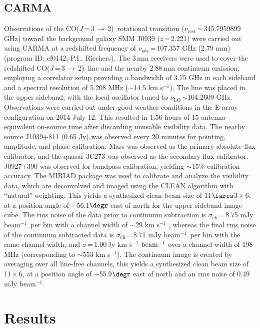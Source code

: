 \documentclass[twocolumn,apj,numberedappendix]{emulateapj}
\newcommand{\CO}{\mbox{CO($J$\,=\,3\,$\rightarrow$\,2) }}
\newcommand{\pmOne}{\mbox{$^{-1}$}}
\begin{document}
\subsection{CARMA} \label{sec:carmadata}
Observations of the \CO rotational transition ($\nu_\textrm{rest}$\,=\,345.7959899 GHz) toward the background galaxy SMM
J0939 ($z$\,=\,2.221) were carried out using CARMA at a redshifted frequency of $\nu_{obs}$\,=\,107.357\,\,GHz (2.79\,\,mm)  (program ID: cf0142; P.I.: Riechers). The 3\,mm receivers were used to cover the redshifted \CO line and the nearby 2.88\,mm continuum emission, employing a correlator setup providing a bandwidth of 3.75 GHz in each sideband and a spectral resolution of 5.208 MHz ($\sim$14.5 km\,\,s\pmOne). The line was placed in the
upper sideband, with the local oscillator tuned to $\nu_\textrm{LO}$\,$\sim$104.2609 GHz.
Observations were carried out under good
weather conditions in the E array configuration on 2014 July 12. This resulted in 1.56 hours of 15 antenna-equivalent on-source time after discarding unusable visibility data.
The nearby source J1039+811 (0.65\,\,Jy) was observed every 20 minutes for
pointing, amplitude, and phase calibration. Mars was observed as the primary
absolute flux calibrator, and the quasar 3C273 was observed as the secondary
flux calibrator. J0927+390 was observed for bandpass calibration, yielding $\sim
$15\% calibration accuracy.
The {\sc MIRIAD} package was used to calibrate and analyze the visibility data, which are deconvolved and imaged using
the CLEAN algorithm with ``natural" weighting. This yields a synthesized clean beam size of 11$\farcs$3\,$\times$\,6, at a position angle of $-$56.1$\degr$ east of north for the upper sideband image cube. 
The rms noise of the data prior to continuum subtraction is $\sigma_\textrm{ch}$\,=\,8.75\,\,mJy\,\,beam\pmOne\ per bin 
with a channel width of $\sim$29 km\,\,s\pmOne
, whereas the final rms noise of the continuum subtracted data is $\sigma_\textrm{ch}$\,=\,8.71\,\,mJy\,\,beam\pmOne\ per bin with 
the same channel width, and $\sigma$\,=\,1.00\,Jy\,\,km\,\,s\pmOne\,\,$\rm beam^{-1}$ over a channel 
width of 198 MHz (corresponding to $\sim$553\,\,km\,\,s\pmOne). 
The continuum image is created by
averaging over all line-free channels, this yields a synthesized clean beam size of 11\,$\times$\,6, at a position angle of $-$55.9$\degr$ east of north and an 
rms noise of 0.49\,\,mJy\,\,beam\pmOne.

\section{Results}\label{sec:res}
\end{document}
